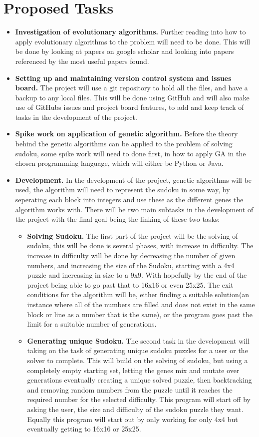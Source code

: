 \documentclass[a4paper,10pt]{article}
\begin{document}
\section*{Proposed Tasks}
\begin{itemize}
	\item \textbf{Investigation of evolutionary algorithms.} Further reading into how to apply evolutionary algorithms to the problem will need to be done. This will be done by looking at papers on google scholar and looking into papers referenced by the most useful papers found.
	\item \textbf{Setting up and maintaining version control system and issues board.} The project will use a git repository to hold all the files, and have a backup to any local files. This will be done using GitHub and will also make use of GitHubs issues and project board features, to add and keep track of tasks in the development of the project. 
	\item \textbf{Spike work on application of genetic algorithm.} Before the theory behind the genetic algorithms can be applied to the problem of solving sudoku, some spike work will need to done first, in how to apply GA in the chosen programming language, which will either be Python or Java.
	\item \textbf{Development.} In the development of the project, genetic algorithms will be used, the algorithm will need to represent the sudoku in some way, by seperating each block into integers and use these as the different genes the algorithm works with. There will be two main subtasks in the development of the project with the final goal being the linking of these two tasks:
	\begin{itemize}
		\item \textbf{Solving Sudoku.} The first part of the project will be the solving of sudoku, this will be done is several phases, with increase in difficulty. The increase in difficulty will be done by decreasing the number of given numbers, and increasing the size of the Sudoku, starting with a 4x4 puzzle and increasing in size to a 9x9. With hopefully by the end of the project being able to go past that to 16x16 or even 25x25. The exit conditions for the algorithm will be, either finding a suitable solution(an instance where all of the numbers are filled and does not exist in the same block or line as a number that is the same), or the program goes past the limit for a suitable number of generations.
		\item \textbf{Generating unique Sudoku.} The second task in the development will taking on the task of generating unique sudoku puzzles for a user or the solver to complete. This will build on the solving of sudoku, but using a completely empty starting set, letting the genes mix and mutate over generations eventually creating a unique solved puzzle, then backtracking and removing random numbers from the puzzle until it reaches the required number for the selected difficulty. This program will start off by asking the user, the size and difficulty of the sudoku puzzle they want. Equally this program will start out by only working for only 4x4 but eventually getting to 16x16 or 25x25. 

\end{itemize}
\end{itemize}
\end{document}
